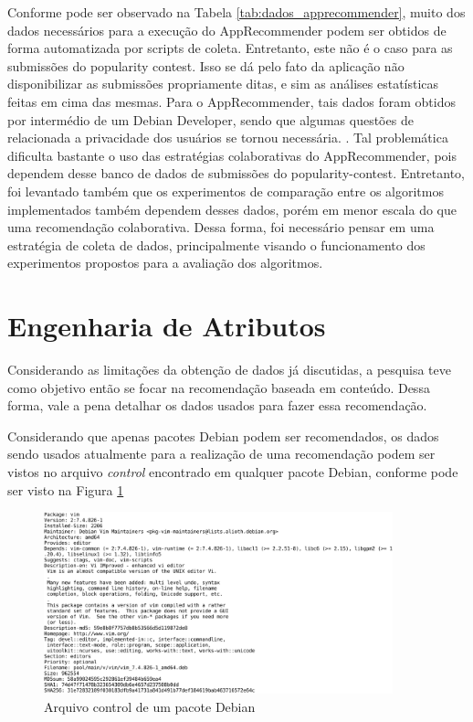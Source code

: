 Conforme pode ser observado na Tabela \ref{tab:dados_apprecommender}, muito dos dados
necessários para a execução do AppRecommender podem ser obtidos de forma automatizada
por scripts de coleta. Entretanto, este não é o caso para as submissões do
popularity contest. Isso se dá pelo fato da aplicação não disponibilizar as submissões
propriamente ditas, e sim as análises estatísticas feitas em cima das mesmas. Para o
AppRecommender, tais dados foram obtidos por intermédio de um Debian Developer, sendo
que algumas questões de relacionada a privacidade dos usuários se tornou necessária.
\cite{araujo2011apprecommender}. Tal problemática dificulta bastante o uso das
estratégias colaborativas do AppRecommender, pois dependem desse banco de dados
de submissões do popularity-contest. Entretanto, foi levantado também que os
experimentos de comparação entre os algoritmos implementados também dependem
desses dados, porém em menor escala do que uma recomendação colaborativa.
Dessa forma, foi necessário pensar em uma estratégia
de coleta de dados, principalmente visando o funcionamento dos experimentos propostos
para a avaliação dos algoritmos.

\section{Engenharia de Atributos}

Considerando as limitações da obtenção de dados já discutidas, a pesquisa teve
como objetivo então se focar na recomendação baseada em conteúdo. Dessa forma,
vale a pena detalhar os dados usados para fazer essa recomendação.

Considerando que apenas pacotes Debian podem ser recomendados, os dados sendo
usados atualmente para a realização de uma recomendação podem ser vistos no
arquivo \textit{control} encontrado em qualquer pacote Debian, conforme pode ser
visto na Figura \ref{fig:control_pacote}

\begin{figure}[h]
  \centering
  \includegraphics[width=0.9\textwidth]{figuras/control_pacote.eps}
  \caption{Arquivo control de um pacote Debian}
  \label{fig:control_pacote}
\end{figure}

